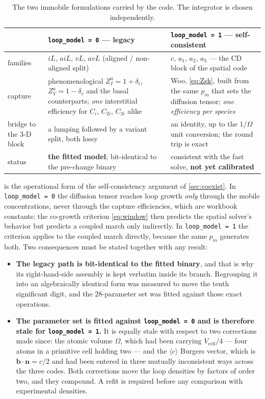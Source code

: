 \documentclass{article}
\newcommand{\cloop}{\ensuremath{\langle c\rangle}}
\newcommand{\bvec}{\bm b}
\newcommand{\nvec}{\bm n}
\begin{document}
\begin{table}[htbp]
\centering
\caption{The two immobile formulations carried by the code. The integrator is
chosen independently.}
\label{tab:loopmodels}
\small
\begin{tabularx}{\textwidth}{@{}p{2.6cm} X X@{}}
\toprule
 & \texttt{loop\_model = 0} --- legacy & \texttt{loop\_model = 1} --- self-consistent \\
\midrule
families & $iL$, $aiL$, $vL$, $avL$ (aligned / non-aligned split) &
  $c$, $a_1$, $a_2$, $a_3$ --- the CD block of the spatial code \\
\addlinespace
capture & phenomenological $Z^a_I=1+\delta_i$, $Z^a_V=1-\delta_v$ and the
  basal counterparts; \emph{one} interstitial efficiency for $C_i$, $C_{2i}$,
  $C_{3i}$ alike &
  Woo, \cref{eq:Zsk}, built from the same $p_m$ that sets the diffusion tensor;
  \emph{one efficiency per species} \\
\addlinespace
bridge to the 3-D block & a lumping followed by a variant split, both lossy &
  an identity, up to the $1/\Omega$ unit conversion; the round trip is exact \\
\addlinespace
status & \textbf{the fitted model}; bit-identical to the pre-change binary &
  consistent with the fast solve, \textbf{not yet calibrated} \\
\bottomrule
\end{tabularx}
\end{table}

 is the operational form of the self-consistency argument
of \cref{sec:coexist}. In \texttt{loop\_model = 0} the diffusion tensor reaches
loop growth \emph{only} through the mobile concentrations, never through the
capture efficiencies, which are workbook constants: the co-growth criterion
\cref{eq:window} then predicts the spatial solver's behavior but predicts a
coupled march only indirectly. In \texttt{loop\_model = 1} the criterion applies
to the coupled march directly, because the same $p_m$ generates both. Two
consequences must be stated together with any result:
\begin{itemize}
\item \textbf{The legacy path is bit-identical to the fitted binary}, and that is
      why its right-hand-side assembly is kept verbatim inside its branch.
      Regrouping it into an algebraically identical form was measured to move
      the tenth significant digit, and the $28$-parameter set was fitted against
      those exact operations.
\item \textbf{The parameter set is fitted against \texttt{loop\_model = 0} and is
      therefore stale for \texttt{loop\_model = 1}.} It is equally stale with
      respect to two corrections made since: the atomic volume $\Omega$, which
      had been carrying $V_{\mathrm{cell}}/4$ --- four atoms in a primitive cell
      holding two --- and the \cloop{} Burgers vector, which is
      $\bvec\!\cdot\!\nvec=c/2$ and had been entered in three mutually
      inconsistent ways across the three codes. Both corrections move the loop
      densities by factors of order two, and they compound. A refit is required
      before any comparison with experimental densities.
\end{itemize}
\end{document}
